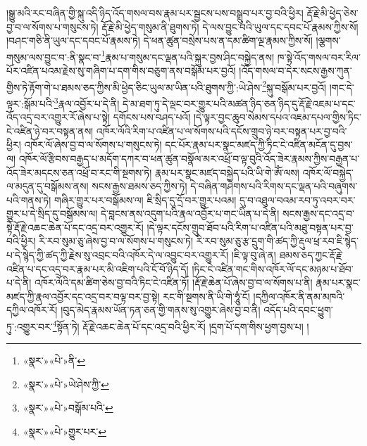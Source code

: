 །སྒྱུ་མའི་རང་བཞིན་གྱི་སྐུ་འདི་ཉིད་འོད་གསལ་བས་རྣམ་པར་སྦྱངས་པས་བསྒྲུབ་པར་བྱ་བའི་ཕྱིར། རྡོ་རྗེ་མི་ཕྱེད་ཅེས་བྱ་བ་ལ་སོགས་པ་གསུངས་ཏེ། རྡོ་རྗེ་མི་ཕྱེད་གསུམ་ནི་ཐུགས་ཏེ། དེ་ལས་བྱུང་བའི་ཡུལ་དང་དབང་པོ་རྣམས་ཀྱིས་སོ། །བཤང་གཅི་ནི་ཡུལ་དང་དབང་པོ་རྣམས་ཏེ། དེ་ཕན་ཚུན་བསྲེས་པས་ན་དམ་ཚིག་ལྔ་རྣམས་ཀྱིས་སོ། །ལྕགས་གསུམ་ལས་བྱུང་བ་:ནི་སྣང་བ་\footnote{«སྣར་»«པེ་»ནི་}རྣམ་པ་གསུམ་དང་ལྡན་པའི་སྐུར་བྱས་ཤིང་བསྐྱེད་ནས། ཁ་སྟེ་འོད་གསལ་བར་རིལ་པོར་འཛིན་པའམ་རྗེས་སུ་གཞིག་པ་དག་གིས་བཅུག་ནས་བསྒོམ་པར་བྱའོ། །འོད་གསལ་བ་དེར་སངས་རྒྱས་ཀུན་གྱིས་ཏེ་རྟོག་གེ་པ་ཐམས་ཅད་ཀྱིས་མི་ཕྱེད་ཅིང་ཡུལ་མ་ཡིན་པའི་ཐུགས་ཀྱི་:ཡེ་ཤེས་\footnote{«སྣར་»«པེ་»ཡེ་ཤེས་ཀྱི་}སྐུ་བསྒོམ་པར་བྱའོ། །གང་དེ་ལྟར་:སྒོམ་པའི་\footnote{«སྣར་»«པེ་»བསྒོམ་པའི་}རྣལ་འབྱོར་པ་དེ་ནི། དེ་མ་ཐག་ཏུ་དེ་ལྡང་བར་གྱུར་པའི་མཚན་ཉིད་ཅན་ཉིད་དུ་རྡོ་རྗེ་འཇམ་པ་དང་འོད་འདྲ་བར་འགྱུར་རོ་ཞེས་པ་སྟེ། དགོངས་པས་བཤད་པའོ། །དེ་ལྟར་བྱང་ཆུབ་སེམས་དཔའ་འཇམ་དཔལ་གྱིས་ཏིང་ངེ་འཛིན་ཉེ་བར་བསྟན་ནས། འཁོར་ལོའི་རིག་པ་འཛིན་པ་ལ་སོགས་པའི་དངོས་གྲུབ་ཉེ་བར་བསྟན་པར་བྱ་བའི་ཕྱིར། འཁོར་ལོ་ཞེས་བྱ་བ་ལ་སོགས་པ་གསུངས་ཏེ། དང་པོར་རྣམ་པར་སྣང་མཛད་ཀྱི་ཏིང་ངེ་འཛིན་མངོན་དུ་བྱས་ལ། འཁོར་ལོ་རྩིབས་བརྒྱད་པ་མདོག་དཀར་བ་ཕན་ཚུན་བསྣོལ་མར་འཕྲོ་བ་ལྟ་བུའི་འོད་ཟེར་རྣམས་ཀྱིས་བརྒྱན་པ་འོད་ཟེར་མདངས་ཅན་འཕྲོ་བ་རང་གི་སྔགས་ཏེ། རྣམ་པར་སྣང་མཛད་བསྐྱེད་པའི་ཡི་གེ་ཨོཾ་ལས། འཁོར་ལོ་བསྐྱེད་ལ་མདུན་དུ་བསྒོམས་ནས། སངས་རྒྱས་ཐམས་ཅད་ཀྱིས་ཏེ། དེ་བཞིན་གཤེགས་པའི་རིགས་དང་ལྡན་པའི་བཞུགས་པའི་གནས་ཏེ། གཞིར་གྱུར་པར་བསྒོམས་ལ། ཇི་སྲིད་དུ་དྲོ་བར་གྱུར་པའམ། དུ་བ་འཐུལ་བའམ་རབ་ཏུ་འབར་བར་གྱུར་པ་དེ་སྲིད་དུ་བསྒོམས་ལ། དེ་བླངས་ནས་འདུག་པའི་རྣལ་འབྱོར་པ་གང་ཡིན་པ་དེ་ནི། སངས་རྒྱས་དང་འདྲ་བ་སྟེ་རྡོ་རྗེ་འཆང་ཆེན་པོ་དང་འདྲ་བར་འགྱུར་རོ། །དེ་ལྟར་དངོས་གྲུབ་ཐོབ་པའི་རིག་པ་འཛིན་པའི་མཐུ་བསྟན་པར་བྱ་བའི་ཕྱིར། རི་རབ་སུམ་ཅུ་ཞེས་བྱ་བ་ལ་སོགས་པ་གསུངས་ཏེ། རི་རབ་སུམ་ཅུ་རྩ་དྲུག་གི་ཚད་ཀྱི་རྡུལ་ཕྲ་རབ་ཇི་སྙེད་པ་དེ་སྙེད་ཀྱི་ཚད་ཀྱི་རྗེས་སུ་འབྲང་བའི་འཁོར་དེ་ལ་འབྱུང་བར་འགྱུར་རོ། །ཇི་ལྟ་བུ་ཞེ་ན། ཐམས་ཅད་ཀྱང་རྡོ་རྗེ་འཛིན་པ་དང་འདྲ་བར་རྣམ་པར་མི་འཇིག་པའི་ངོ་བོ་ཉིད་དོ། །ཏིང་ངེ་འཛིན་གང་གིས་འཁོར་ལོ་དང་མཉམ་པ་ཐོབ་པ་དེ་ནི། འཁོར་ལོའི་དམ་ཚིག་ཅེས་བྱ་བའི་ཏིང་ངེ་འཛིན་ཏོ། །རྡོ་རྗེ་ཆེན་པོ་ཞེས་བྱ་བ་ལ་སོགས་པ་ནི། རྣམ་པར་སྣང་མཛད་ཀྱི་རྣལ་འབྱོར་དང་འདྲ་བར་བལྟ་བར་བྱ་སྟེ། རང་གི་སྔགས་ནི་ཡི་གེ་ཧཱུཾ་ངོ། །དཀྱིལ་འཁོར་ནི་ནམ་མཁའི་དཀྱིལ་འཁོར་རོ། །བུད་མེད་རྣམས་ཡོན་ཏན་ཅན་གྱི་གནས་སུ་འགྱུར་ཞེས་བྱ་བ་ནི། འདོད་པའི་དབང་ཕྱུག་ཏུ་:འགྱུར་བར་\footnote{«སྣར་»«པེ་»གྱུར་པར་}སྟོན་ཏེ། རྡོ་རྗེ་འཆང་ཆེན་པོ་དང་འདྲ་བའི་ཕྱིར་རོ། །དྲག་པོ་དག་གིས་ཕྱག་བྱས་པ། །
